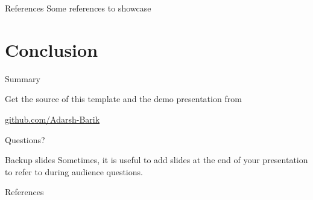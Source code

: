 \documentclass[xetex]{beamer}
\begin{document}
\begin{frame}{References}
  Some references to showcase \cite{knuth92,ConcreteMath,Simpson,Er01,greenwade93}
\end{frame}

\section{Conclusion}

\begin{frame}{Summary}

  Get the source of this template and the demo presentation from

  \begin{center}\url{github.com/Adarsh-Barik}\end{center}



\end{frame}

\begin{frame}
  \centering Questions?
\end{frame}


\begin{frame}[fragile]{Backup slides}
  Sometimes, it is useful to add slides at the end of your presentation to
  refer to during audience questions.

\end{frame}

\begin{frame}[allowframebreaks]{References}

  
  

\end{frame}
\end{document}
